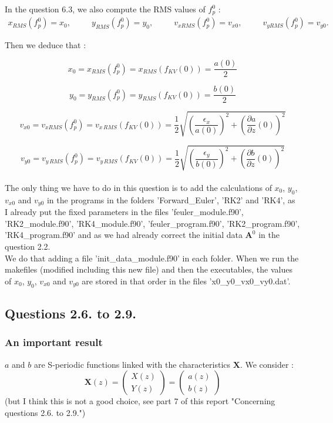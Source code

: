 \documentclass[10pt]{article}
\newcommand{\D}{{\partial}}
\begin{document}
In the question 6.3, we also compute the RMS values of $f_p^0$ :
\begin{align*}
x_{RMS}\left(f_p^0\right) = x_0, \;\;\;\;\;\;\;\;\; y_{RMS}\left(f_p^0\right) = y_0, \;\;\;\;\;\;\;\;\; v_{xRMS}\left(f_p^0\right) = v_{x0}, \;\;\;\;\;\;\;\;\; v_{yRMS}\left(f_p^0\right) = v_{y0}.
\end{align*}

Then we deduce that :

$$\boxed{x_0 = x_{RMS}\left(f_p^0\right) = x_{RMS}(f_{KV}(0)) = \frac{a(0)}{2}}$$

$$\boxed{y_0 = y_{RMS}\left(f_p^0\right) = y_{RMS}(f_{KV}(0)) = \frac{b(0)}{2}} $$

$$\boxed{v_{x0} = v_{xRMS}\left(f_p^0\right) = v_{x\,RMS}(f_{KV}(0)) = \frac{1}{2}\sqrt{\left(\frac{\epsilon_{x}}{a(0)}\right)^2 + \left(\frac{\D a}{\D z}(0)\right)^2}}$$

$$\boxed{v_{y0} = v_{y\,RMS}(f_p^0) = v_{y\,RMS}(f_{KV}(0)) = \frac{1}{2}\sqrt{\left(\frac{\epsilon_{y}}{b(0)}\right)^2 + \left(\frac{\D b}{\D z}(0)\right)^2}}$$ \\


The only thing we have to do in this question is to add the calculations of $x_0$, $y_0$, $v_{x0}$ and $v_{y0}$ in the programs in the folders 'Forward\_Euler', 'RK2' and 'RK4', as I already put the fixed parameters in the files 'feuler\_module.f90', 'RK2\_module.f90', 'RK4\_module.f90', 'feuler\_program.f90', 'RK2\_program.f90', 'RK4\_program.f90' and as we had already correct the initial data $\mathbf{A}^0$ in the question 2.2. \\

We do that adding a file 'init\_data\_module.f90' in each folder. When we run the makefiles (modified including this new file) and then the executables, the values of $x_0$, $y_0$, $v_{x0}$ and $v_{y0}$ are stored in that order in the files 'x0\_y0\_vx0\_vy0.dat'.


\subsection{Questions 2.6. to 2.9.}


\subsubsection{An important result}


$a$ and $b$ are S-periodic functions linked with the characteristics $\mathbf{X}$. We consider :
$$\mathbf{X}(z)
= \left( \begin{array}{c} X(z) \\ Y(z) \end{array}\right)
= \left( \begin{array}{c} a(z) \\ b(z) \end{array}\right)$$
(but I think this is not a good choice, see part 7 of this report "Concerning questions 2.6. to 2.9.") \\
\end{document}
